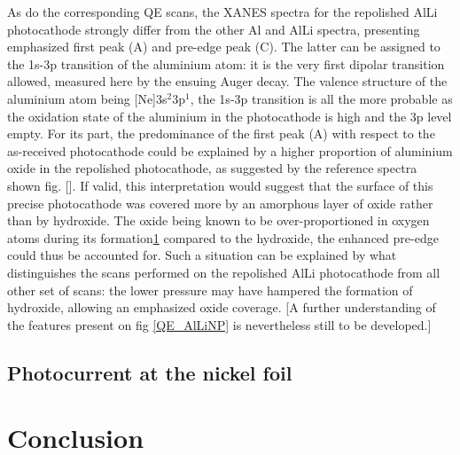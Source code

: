 \documentclass[aip,graphicx]{revtex4-1}
\begin{document}
As do the corresponding QE scans, the XANES spectra for the repolished AlLi photocathode strongly differ from the other Al and AlLi spectra, presenting emphasized first peak (A) and pre-edge peak (C). The latter can be assigned to the 1s-3p transition of the aluminium atom: it is the very first dipolar transition allowed, measured here by the ensuing Auger decay. The valence structure of the aluminium atom being [Ne]3s$^2$3p$^1$, the 1s-3p transition is all the more probable as the oxidation state of the aluminium in the photocathode is high and the 3p level empty. For its part, the predominance of the first peak (A) with respect to the as-received photocathode could be explained by a higher proportion of aluminium oxide in the repolished photocathode, as suggested by the reference spectra shown fig. []. If valid, this interpretation would suggest that the surface of this precise photocathode was covered more by an amorphous layer of oxide rather than by hydroxide. The oxide being known to be over-proportioned in oxygen atoms during its formation\ref{} compared to the hydroxide, the enhanced pre-edge could thus be accounted for. Such a situation can be explained by what distinguishes the scans performed on the repolished AlLi photocathode from all other set of scans: the lower pressure may have hampered the formation of hydroxide, allowing an emphasized oxide coverage. 
[A further understanding of the features present on fig \ref{QE_AlLiNP} is nevertheless still to be developed.] 

\subsection{Photocurrent at the nickel foil}

\section{Conclusion}


%
%
\end{document}
